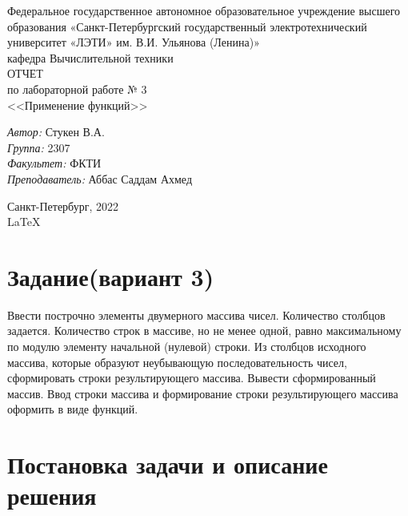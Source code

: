 \documentclass[a4paper,12pt]{report}
\begin{document}
 

\begin{titlepage} 

\begin{center} 

\large Федеральное государственное автономное образовательное учреждение высшего образования «Санкт-Петербургский государственный электротехнический университет «ЛЭТИ» им. В.И. Ульянова (Ленина)»\\
кафедра Вычислительной техники\\[5cm] 

\huge ОТЧЕТ\\ по лабораторной работе № 3\\[0.5cm] 
\large <<Применение функций>>\\[3.7cm]

\begin{minipage}{1\textwidth}
    \begin{flushleft}
        \emph{Автор:} Стукен В.А.\\
        \emph{Группа:} 2307\\
        \emph{Факультет:} ФКТИ\\
        \emph{Преподаватель:} Аббас Саддам Ахмед\\
    \end{flushleft}
\end{minipage}

\vfill

Санкт-Петербург, 2022\\
{\large \LaTeX}

\end{center}
\thispagestyle{empty}
\end{titlepage}

\section*{Задание(вариант 3)}
Ввести построчно элементы двумерного массива чисел. Количество столбцов задается. Количество строк в массиве, но не менее одной, равно максимальному по модулю элементу начальной (нулевой) строки. Из столбцов исходного массива, которые образуют неубывающую последовательность чисел, сформировать строки результирующего массива. Вывести сформированный массив. Ввод строки массива и формирование строки результирующего массива оформить в виде функций.

\section*{Постановка задачи и описание решения}
\par
\end{document}
